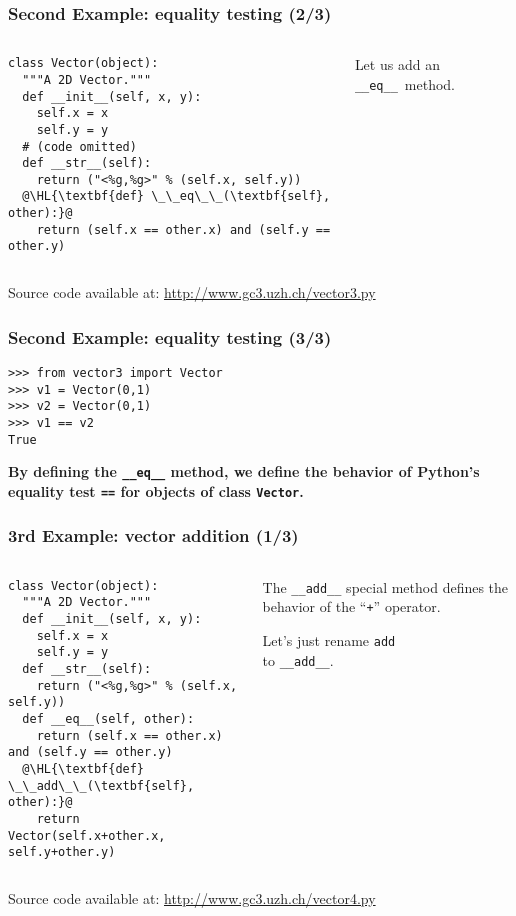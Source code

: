 \documentclass[english,serif,mathserif,xcolor=pdftex,dvipsnames,table]{beamer}
\begin{document}
\begin{frame}[fragile]
  \frametitle{Second Example: equality testing (2/3)}
  \begin{columns}[t]
    \begin{column}{0.5\textwidth}
\begin{lstlisting}
class Vector(object):
  """A 2D Vector."""
  def __init__(self, x, y):
    self.x = x
    self.y = y
  # (code omitted)
  def __str__(self):
    return ("<%g,%g>" % (self.x, self.y))
  @\HL{\textbf{def} \_\_eq\_\_(\textbf{self}, other):}@
    return (self.x == other.x) and (self.y == other.y)
\end{lstlisting}
    \end{column}
    \begin{column}{0.5\textwidth}
      \raggedleft
      Let us add an \lstinline|__eq__|~method.
    \end{column}
  \end{columns}

  \+
  {\scriptsize Source code available at:
    \url{http://www.gc3.uzh.ch/vector3.py}}
\end{frame}


\begin{frame}[fragile]
  \frametitle{Second Example: equality testing (3/3)}
\begin{lstlisting}
>>> from vector3 import Vector
>>> v1 = Vector(0,1)
>>> v2 = Vector(0,1)
>>> v1 == v2
True
\end{lstlisting}

  \+ {\bfseries By defining the \lstinline|__eq__| method, we
    define the behavior of Python's equality test \lstinline|==| for
    objects of class \texttt{Vector}.}
\end{frame}


\begin{frame}[fragile]
  \frametitle{3rd Example: vector addition (1/3)}
  \begin{columns}[t]
    \begin{column}{0.5\textwidth}
\begin{lstlisting}
class Vector(object):
  """A 2D Vector."""
  def __init__(self, x, y):
    self.x = x
    self.y = y
  def __str__(self):
    return ("<%g,%g>" % (self.x, self.y))
  def __eq__(self, other):
    return (self.x == other.x) and (self.y == other.y)
  @\HL{\textbf{def} \_\_add\_\_(\textbf{self}, other):}@
    return Vector(self.x+other.x, self.y+other.y)
\end{lstlisting}
    \end{column}
    \begin{column}{0.5\textwidth}
      \raggedleft
      The \lstinline|__add__| special method defines the behavior of the
      ``\texttt{+}'' operator.

      \+
      Let's just rename \texttt{add} \\ to \texttt{\_\_add\_\_}.
    \end{column}
  \end{columns}

  \+
  {\scriptsize Source code available at:
    \url{http://www.gc3.uzh.ch/vector4.py}}
\end{frame}
\end{document}
